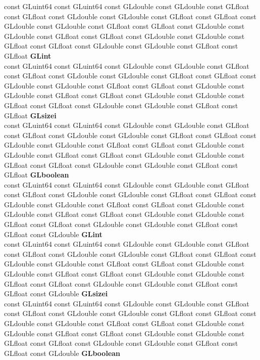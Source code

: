 \begin{DoxyCompactItemize}
\begin{tabbing}
\>const GLuint64 const GLuint64 const GLdouble const GLdouble const GLfloat const GLfloat const GLdouble const GLdouble const GLfloat const GLfloat const GLdouble const GLdouble const GLfloat const GLfloat const GLdouble const GLdouble const GLfloat const GLfloat const GLdouble const GLdouble const GLfloat const GLfloat const GLdouble const GLdouble const GLfloat const GLfloat {\bfseries GLint}\\
\>const GLuint64 const GLuint64 const GLdouble const GLdouble const GLfloat const GLfloat const GLdouble const GLdouble const GLfloat const GLfloat const GLdouble const GLdouble const GLfloat const GLfloat const GLdouble const GLdouble const GLfloat const GLfloat const GLdouble const GLdouble const GLfloat const GLfloat const GLdouble const GLdouble const GLfloat const GLfloat {\bfseries GLsizei}\\
\>const GLuint64 const GLuint64 const GLdouble const GLdouble const GLfloat const GLfloat const GLdouble const GLdouble const GLfloat const GLfloat const GLdouble const GLdouble const GLfloat const GLfloat const GLdouble const GLdouble const GLfloat const GLfloat const GLdouble const GLdouble const GLfloat const GLfloat const GLdouble const GLdouble const GLfloat const GLfloat {\bfseries GLboolean}\\
\>const GLuint64 const GLuint64 const GLdouble const GLdouble const GLfloat const GLfloat const GLdouble const GLdouble const GLfloat const GLfloat const GLdouble const GLdouble const GLfloat const GLfloat const GLdouble const GLdouble const GLfloat const GLfloat const GLdouble const GLdouble const GLfloat const GLfloat const GLdouble const GLdouble const GLfloat const GLfloat const GLdouble {\bfseries GLint}\\
\>const GLuint64 const GLuint64 const GLdouble const GLdouble const GLfloat const GLfloat const GLdouble const GLdouble const GLfloat const GLfloat const GLdouble const GLdouble const GLfloat const GLfloat const GLdouble const GLdouble const GLfloat const GLfloat const GLdouble const GLdouble const GLfloat const GLfloat const GLdouble const GLdouble const GLfloat const GLfloat const GLdouble {\bfseries GLsizei}\\
\>const GLuint64 const GLuint64 const GLdouble const GLdouble const GLfloat const GLfloat const GLdouble const GLdouble const GLfloat const GLfloat const GLdouble const GLdouble const GLfloat const GLfloat const GLdouble const GLdouble const GLfloat const GLfloat const GLdouble const GLdouble const GLfloat const GLfloat const GLdouble const GLdouble const GLfloat const GLfloat const GLdouble {\bfseries GLboolean}\\

\end{tabbing}
\end{DoxyCompactItemize}
